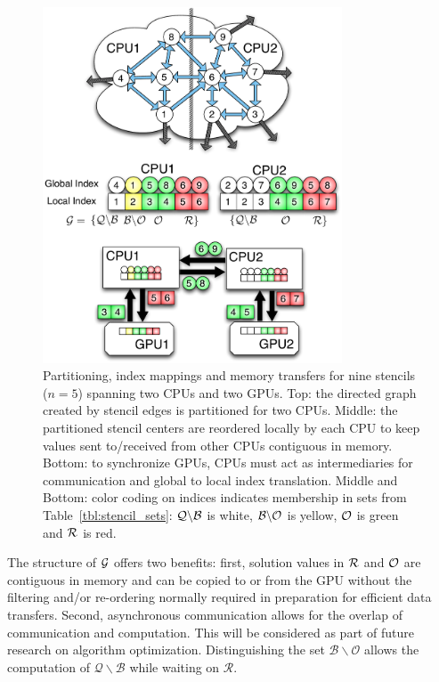         \begin{figure}[ht] 
            \centering
            \includegraphics[width=3.5in]{figures/paper1/figures/omnigraffle/SimpleExample.pdf} 
            \caption{Partitioning, index mappings and memory transfers for nine stencils ($n=5$) spanning two CPUs and two GPUs. Top: the directed graph created by stencil edges is partitioned for two CPUs. Middle: the partitioned stencil centers are reordered locally by each CPU to keep values sent to/received from other CPUs contiguous in memory. Bottom: to synchronize GPUs, CPUs must act as intermediaries for communication and global to local index translation. Middle and Bottom: color coding on indices indicates membership in sets from Table~\ref{tbl:stencil_sets}: $\mathcal{Q} \backslash \mathcal{B}$ is white, $\mathcal{B} \backslash \mathcal{O}$ is yellow, $\mathcal{O}$ is green and $\mathcal{R}$ is red.
            }
            \label{fig:stencilSets2CPU}
        \end{figure}	

 The structure of $\mathcal{G}$ offers two benefits: first, solution values in $\mathcal{R}$ and $\mathcal{O}$ are contiguous in memory and can be copied to or from the GPU without the filtering and/or re-ordering normally required in preparation for efficient data transfers. Second, asynchronous communication allows for the overlap of communication and computation. This will be considered as part of future research on algorithm optimization.  Distinguishing the set $\mathcal{B} \backslash \mathcal{O}$ allows the computation of $\mathcal{Q}\backslash \mathcal{B}$ while waiting on $\mathcal{R}$. 

